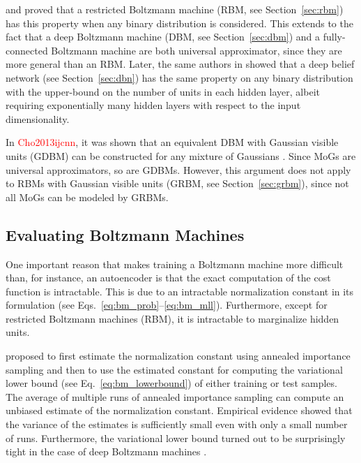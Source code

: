\documentclass{now}
\newcommand{\alert}[1]{\textcolor{red}{#1}}
\newcommand{\citepub}[1]{\alert{#1}}
\begin{document}
\citet{Roux2008} and \citet{Freund1994}  proved that a
restricted Boltzmann machine (RBM, see
Section~\ref{sec:rbm}) has this property when any binary
distribution is considered. This extends to the
fact that a deep Boltzmann machine (DBM, see
Section~\ref{sec:dbm}) and a fully-connected Boltzmann
machine are both universal approximator, since they are more
general than an RBM.  Later, the same authors in
\citep{Roux2010} showed that a deep belief network (see
Section~\ref{sec:dbn}) has the same property on any binary
distribution with the upper-bound on the number of units in
each hidden layer, albeit requiring exponentially many
hidden layers with respect to the input dimensionality. 

In \citepub{Cho2013ijcnn}, it was shown that an equivalent
DBM with Gaussian visible units (GDBM) can be constructed for any
mixture of Gaussians \citep[MoG, see, e.g.,][]{Bishop2006}.
Since MoGs are universal approximators, so are GDBMs.
However, this argument does not apply to RBMs with Gaussian
visible units (GRBM, see Section~\ref{sec:grbm}), since not
all MoGs can be modeled by GRBMs.

\subsection{Evaluating Boltzmann Machines}
\label{sec:eval_bm}

One important reason that makes training a Boltzmann machine
more difficult than, for instance, an autoencoder is that
the exact computation of the cost function is intractable.
This is 
due to an intractable
normalization constant in its formulation (see
Eqs.~\eqref{eq:bm_prob}--\eqref{eq:bm_mll}). Furthermore, except
for restricted Boltzmann machines (RBM), it is intractable to
marginalize hidden units.

\citet{Salakhutdinov2008a} proposed to first estimate the
normalization constant using annealed importance sampling
\citep{Neal1998} and then to use the estimated constant for
computing the variational lower bound (see
Eq.~\eqref{eq:bm_lowerbound}) of either training or test
samples. The average of multiple runs of annealed
importance sampling can compute an unbiased estimate of the
normalization constant. Empirical evidence
\citep{Salakhutdinov2008} showed that the variance of the
estimates is sufficiently small even with only a small
number of runs.  Furthermore, the variational lower bound
turned out to be surprisingly tight in the case of deep
Boltzmann machines \citep{Salakhutdinov2012nc}.
\end{document}
